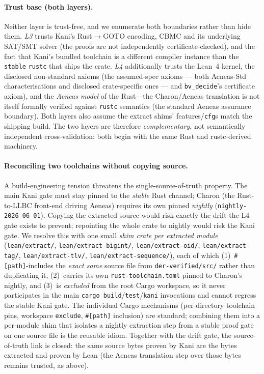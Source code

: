 \documentclass[10pt,twocolumn]{article}
\newcommand{\code}[1]{\texttt{\small #1}}
\begin{document}
\paragraph{Trust base (both layers).}
Neither layer is trust-free, and we enumerate both boundaries rather than hide
them. \emph{L3} trusts Kani's Rust${\to}$GOTO encoding, CBMC and its underlying
SAT/SMT solver (the proofs are not independently certificate-checked), and the
fact that Kani's bundled toolchain is a different compiler instance than the
\code{stable} \code{rustc} that ships the crate. \emph{L4} additionally trusts
the Lean~4 kernel, the disclosed non-standard axioms (the assumed-spec axioms ---
both Aeneas-Std characterisations and disclosed crate-specific ones --- and
\code{bv\_decide}'s certificate axiom), and the \emph{Aeneas model} of the
Rust---the Charon/Aeneas translation is not itself formally verified against
\code{rustc} semantics (the standard Aeneas assurance boundary). Both layers
also assume the extract shims' features/\code{cfg}s match the shipping build.
The two layers are therefore \emph{complementary}, not semantically independent
cross-validation: both begin with the same Rust and rustc-derived machinery.

\paragraph{Reconciling two toolchains without copying source.}
\label{sec:shim}
A build-engineering tension threatens the single-source-of-truth property. The
main Kani gate must stay pinned to the \emph{stable} Rust channel; Charon (the
Rust-to-LLBC front-end driving Aeneas) requires its own pinned \emph{nightly}
(\code{nightly-2026-06-01}). Copying the extracted source would risk exactly
the drift the L4 gate exists to prevent; repointing the whole crate to nightly
would risk the Kani gate. We resolve this with one small \emph{shim crate per
extracted module} (\code{lean/extract/}, \code{lean/extract-bigint/},
\code{lean/extract-oid/}, \code{lean/extract-tag/}, \code{lean/extract-tlv/},
\code{lean/extract-sequence/}), each of which (1)~\code{\#[path]}-includes the
\emph{exact same} source file from \code{der-verified/src/} rather than
duplicating it, (2)~carries its own \code{rust-toolchain.toml} pinned to
Charon's nightly, and (3)~is \emph{excluded} from the root Cargo workspace, so
it never participates in the main \code{cargo build}/\code{test}/\code{kani}
invocations and cannot regress the stable Kani gate. The individual Cargo
mechanisms (per-directory toolchain pins, workspace \code{exclude},
\code{\#[path]} inclusion) are standard; combining them into a per-module shim
that isolates a nightly extraction step from a stable proof gate on one source
file is the reusable idiom. Together with the drift gate, the source-of-truth
link is closed: the same source bytes proven by Kani are the bytes extracted and
proven by Lean (the Aeneas translation step over those bytes remains trusted, as
above).
\end{document}
